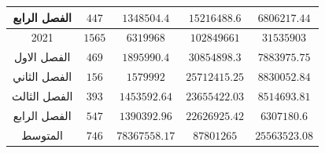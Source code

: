 \documentclass[10pt,a4paper]{report}
\begin{document}
\begin{longtable}{|c|c|c|c|c|}
الفصل الرابع & $447$                 & $1348504.4$      & $15216488.6$   & $6806217.44$       \\ \hline
2021         & $1565$                & $6319968$        & $102849661$    & $31535903$         \\ \hline
الفصل الاول  & $469$                 & $1895990.4$      & $30854898.3$   & $7883975.75$       \\ \hline
الفصل الثاني & $156$                 & $1579992$        & $25712415.25$  & $8830052.84$       \\ \hline
الفصل الثالث & $393$                 & $1453592.64$     & $23655422.03$  & $8514693.81$       \\ \hline
الفصل الرابع & $547$                 & $1390392.96$     & $22626925.42$  & $6307180.6$        \\ \hline
\rowcolor[HTML]{DAE8FC} 
المتوسط      & $746$                 & $78367558.17$    & $87801265$     & $25563523.08$      \\ \hline
\end{longtable}
\end{document}
